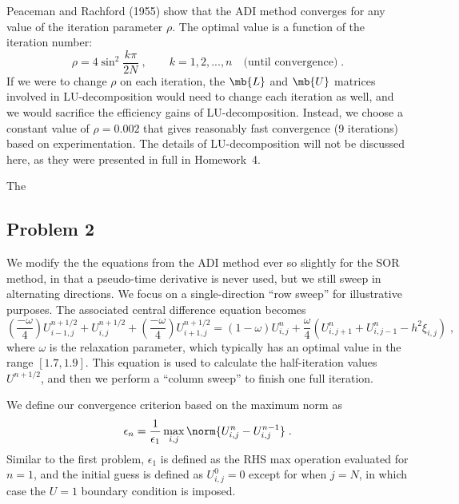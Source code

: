 \documentclass[11pt]{article}
\begin{document}
Peaceman and Rachford (1955) show that the ADI method converges for any value of the iteration parameter $\rho$. The optimal value is a function of the iteration number:
\begin{equation}
\rho = 4 \sin^2 \frac{k \pi}{2 N}
\;, \qquad
k = 1, 2, ..., n \quad \text{(until convergence)}
\;.
\end{equation}
If we were to change $\rho$ on each iteration, the $\mb{L}$ and $\mb{U}$ matrices involved in LU-decomposition would need to change each iteration as well, and we would sacrifice the efficiency gains of LU-decomposition. Instead, we choose a constant value of $\rho = 0.002$ that gives reasonably fast convergence (9 iterations) based on experimentation. The details of LU-decomposition will not be discussed here, as they were presented in full in Homework~4.

The 

\subsection{Problem 2}

We modify the the equations from the ADI method ever so slightly for the SOR method, in that a pseudo-time derivative is never used, but we still sweep in alternating directions. We focus on a single-direction ``row sweep'' for illustrative purposes. The associated central difference equation becomes
\begin{equation}
\left( \frac{-\omega}{4} \right) U_{i-1,j}^{n+1/2}
+ U_{i,j}^{n+1/2}
+ \left( \frac{-\omega}{4} \right) U_{i+1,j}^{n+1/2}
=
\left( 1 - \omega \right) U_{i,j}^n
+ \frac{\omega}{4}
\left(
U_{i,j+1}^{n} + U_{i,j-1}^{n} - h^2 \xi_{i,j}
\right)
\;,
\end{equation}
where $\omega$ is the relaxation parameter, which typically has an optimal value in the range $[1.7,1.9]$. This equation is used to calculate the half-iteration values $U^{n+1/2}$, and then we perform a ``column sweep'' to finish one full iteration.

We define our convergence criterion based on the maximum norm as
\begin{equation}
\epsilon_n = \frac{1}{\epsilon_1} \max_{i,j} \norm{U_{i,j}^{n} - U_{i,j}^{n-1}}
\;.
\end{equation}
Similar to the first problem, $\epsilon_1$ is defined as the RHS max operation evaluated for $n=1$, and the initial guess is defined as $U_{i,j}^0 = 0$ except for when $j=N$, in which case the $U=1$ boundary condition is imposed.
\end{document}
